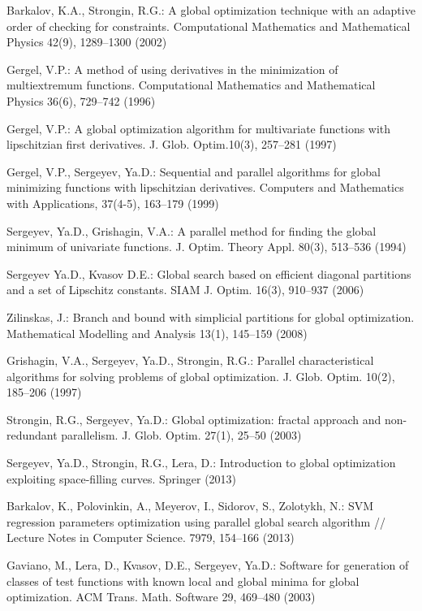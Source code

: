 \documentclass[smallcondensed]{svjour3}     %
\begin{document}
\begin{thebibliography}{}
Barkalov, K.A., Strongin, R.G.: A global optimization technique with an adaptive order of checking for constraints. Computational Mathematics and Mathematical Physics 42(9), 1289--1300 (2002)

Gergel, V.P.: A method of using derivatives in the minimization of multiextremum functions. Computational Mathematics and Mathematical Physics 36(6), 729--742 (1996)

Gergel, V.P.: A global optimization algorithm for multivariate functions with lipschitzian first derivatives. J. Glob. Optim.10(3), 257--281 (1997)

Gergel, V.P., Sergeyev, Ya.D.: Sequential and parallel algorithms for global minimizing functions with lipschitzian derivatives. Computers and Mathematics with Applications, 37(4-5), 163--179 (1999)

Sergeyev, Ya.D., Grishagin, V.A.: A parallel method for finding the global minimum of univariate functions. J. Optim. Theory Appl. 80(3), 513--536 (1994)

Sergeyev Ya.D., Kvasov D.E.: Global search based on efficient diagonal partitions and a set of Lipschitz constants. SIAM J. Optim. 16(3), 910--937 (2006)

Zilinskas, J.: Branch and bound with simplicial partitions for global optimization. Mathematical Modelling and Analysis 13(1), 145--159 (2008)

Grishagin, V.A., Sergeyev, Ya.D., Strongin, R.G.: Parallel characteristical algorithms for solving problems of global optimization. J. Glob. Optim. 10(2), 185--206 (1997)

Strongin, R.G., Sergeyev, Ya.D.: Global optimization: fractal approach and non-redundant parallelism. J. Glob. Optim. 27(1), 25--50 (2003)

Sergeyev, Ya.D., Strongin, R.G., Lera, D.: Introduction to global optimization exploiting space-filling curves. Springer (2013)

Barkalov, K., Polovinkin, A., Meyerov, I., Sidorov, S., Zolotykh, N.: SVM regression parameters optimization using parallel global search algorithm // Lecture Notes in Computer Science. 7979, 154--166 (2013)

Gaviano, M., Lera, D., Kvasov, D.E., Sergeyev, Ya.D.: Software for generation of classes of test functions with known local and global minima for global optimization. ACM Trans. Math. Software 29, 469--480 (2003)


\end{thebibliography}
\end{document}
